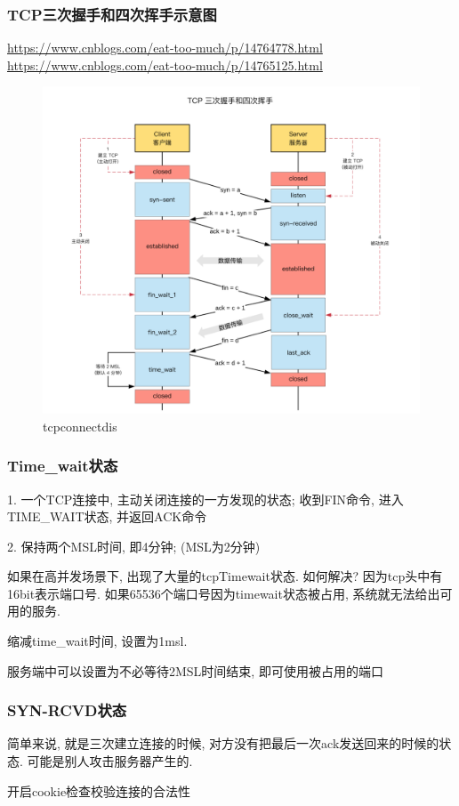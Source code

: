 \subsubsection{TCP三次握手和四次挥手示意图}
\url{https://www.cnblogs.com/eat-too-much/p/14764778.html}
\url{https://www.cnblogs.com/eat-too-much/p/14765125.html}
\begin{figure}
	\centering
	\includegraphics[width=0.7\linewidth]{figures/tcpconnectdis.png}
	\caption{tcpconnectdis}
	\label{fig:tcpconnectdis}
\end{figure}
\subsubsection{Time\_wait状态}
1. 一个TCP连接中, 主动关闭连接的一方发现的状态; 收到FIN命令, 进入TIME\_WAIT状态, 并返回ACK命令

2. 保持两个MSL时间, 即4分钟; (MSL为2分钟)

如果在高并发场景下, 出现了大量的tcpTimewait状态. 如何解决? 因为tcp头中有16bit表示端口号. 如果65536个端口号因为timewait状态被占用, 系统就无法给出可用的服务.

缩减time\_wait时间, 设置为1msl.

服务端中可以设置为不必等待2MSL时间结束, 即可使用被占用的端口
\subsubsection{SYN-RCVD状态}
简单来说, 就是三次建立连接的时候, 对方没有把最后一次ack发送回来的时候的状态. 可能是别人攻击服务器产生的. \par

开启cookie检查校验连接的合法性

